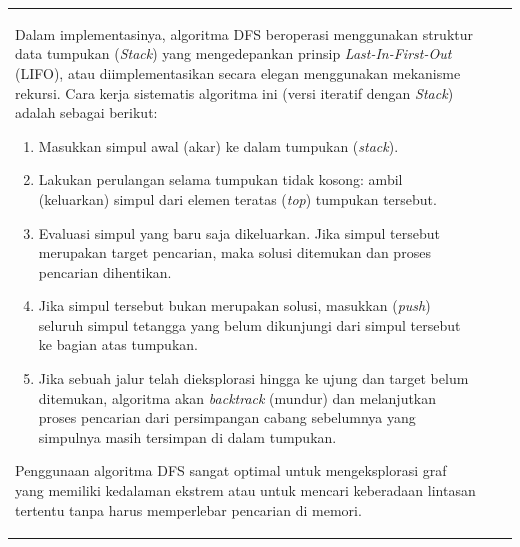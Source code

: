 \documentclass[12pt]{article}
\begin{document}
\begin{table}[H]
\begin{tabular}{|l|c|c|}
\begin{document}
Dalam implementasinya, algoritma DFS beroperasi menggunakan struktur data tumpukan (\textit{Stack}) yang mengedepankan prinsip \textit{Last-In-First-Out} (LIFO), atau diimplementasikan secara elegan menggunakan mekanisme rekursi. Cara kerja sistematis algoritma ini (versi iteratif dengan \textit{Stack}) adalah sebagai berikut:
\begin{enumerate}
    \item Masukkan simpul awal (akar) ke dalam tumpukan (\textit{stack}).
    \item Lakukan perulangan selama tumpukan tidak kosong: ambil (keluarkan) simpul dari elemen teratas (\textit{top}) tumpukan tersebut.
    \item Evaluasi simpul yang baru saja dikeluarkan. Jika simpul tersebut merupakan target pencarian, maka solusi ditemukan dan proses pencarian dihentikan.
    \item Jika simpul tersebut bukan merupakan solusi, masukkan (\textit{push}) seluruh simpul tetangga yang belum dikunjungi dari simpul tersebut ke bagian atas tumpukan. 
    \item Jika sebuah jalur telah dieksplorasi hingga ke ujung dan target belum ditemukan, algoritma akan \textit{backtrack} (mundur) dan melanjutkan proses pencarian dari persimpangan cabang sebelumnya yang simpulnya masih tersimpan di dalam tumpukan.
\end{enumerate}

Penggunaan algoritma DFS sangat optimal untuk mengeksplorasi graf yang memiliki kedalaman ekstrem atau untuk mencari keberadaan lintasan tertentu tanpa harus memperlebar pencarian di memori.


\end{document}
\end{tabular}
\end{table}
\end{document}
